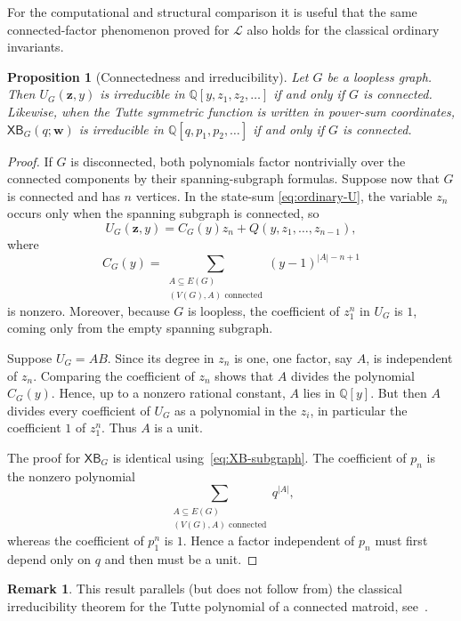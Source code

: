 \documentclass[11pt]{article}
\theoremstyle{plain}
\newtheorem{proposition}[theorem]{Proposition}
\theoremstyle{definition}
\newtheorem{remark}[theorem]{Remark}
\renewcommand{\mathcal}{\mathscr}
\newcommand{\LL}{\mathcal{L}}    %
\newcommand{\bw}{\mathbf{w}}
\newcommand{\bz}{\mathbf{z}}
\newcommand{\XB}{\mathsf{XB}} %
\newcommand{\QQ}{\mathbb Q}
\numberwithin{equation}{section}
\begin{document}
For the computational and structural comparison it is useful that the same
connected-factor phenomenon proved for $\LL$ also holds for the classical
ordinary invariants.

\begin{proposition}[Connectedness and irreducibility]
\label{prop:U-XB-irreducible}
Let $G$ be a loopless graph.  Then $U_G(\bz,y)$ is irreducible in
$\QQ[y,z_1,z_2,\ldots]$ if and only if $G$ is connected.  Likewise,
when the Tutte symmetric function is written in power-sum coordinates,
$\XB_G(q;\bw)$ is irreducible in
$\QQ[q,p_1,p_2,\ldots]$ if and only if $G$ is connected.
\end{proposition}

\begin{proof}
If $G$ is disconnected, both polynomials factor nontrivially over the
connected components by their spanning-subgraph formulas.  Suppose now that
$G$ is connected and has $n$ vertices.  In the state-sum
\eqref{eq:ordinary-U}, the variable $z_n$ occurs only when the spanning
subgraph is connected, so
\[
   U_G(\bz,y)
   =C_G(y)z_n+Q(y,z_1,\ldots,z_{n-1}),
\]
where
\[
   C_G(y)=
   \sum_{\substack{A\subseteq E(G)\\(V(G),A)\text{ connected}}}
   (y-1)^{|A|-n+1}
\]
is nonzero.  Moreover, because $G$ is loopless, the coefficient of $z_1^n$
in $U_G$ is $1$, coming only from the empty spanning subgraph.

Suppose $U_G=AB$.  Since its degree in $z_n$ is one, one factor, say $A$,
is independent of $z_n$.  Comparing the coefficient of $z_n$ shows that
$A$ divides the polynomial $C_G(y)$.  Hence, up to a nonzero rational
constant, $A$ lies in $\QQ[y]$.  But then $A$ divides every coefficient
of $U_G$ as a polynomial in the $z_i$, in particular the coefficient $1$ of
$z_1^n$.  Thus $A$ is a unit.

The proof for $\XB_G$ is identical using~\eqref{eq:XB-subgraph}.  The
coefficient of $p_n$ is the nonzero polynomial
\[
   \sum_{\substack{A\subseteq E(G)\\(V(G),A)\text{ connected}}}q^{|A|},
\]
whereas the coefficient of $p_1^n$ is $1$.  Hence a factor independent of
$p_n$ must first depend only on $q$ and then must be a unit.
\end{proof}

\begin{remark}\label{rem:tutte-irreducibility}
This result parallels (but does not follow from) the classical irreducibility theorem for the
Tutte polynomial of a connected matroid, see~\cite{MMN}.
\end{remark}
\end{document}
